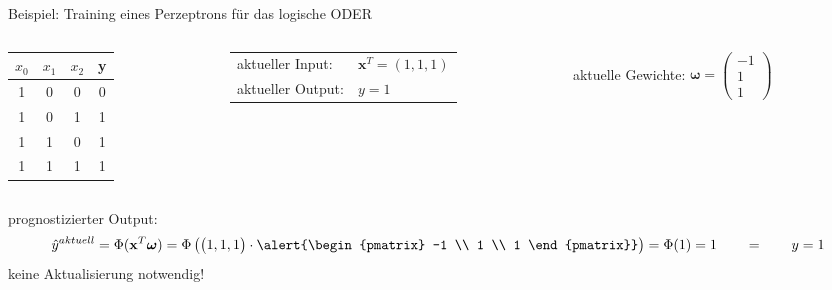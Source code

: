 \documentclass[11pt, aspectratio=169, t]{beamer}
\begin{document}
\begin{frame}{Beispiel: Training eines Perzeptrons für das logische ODER}
\begin{small}
\begin{columns}
\begin{column}{0.25\textwidth}
\hspace{0.5cm}
\begin{footnotesize}
\begin{tabular}{cccc} \toprule
$x_0$ & $x_1$ & $x_2$ & y \\ \midrule
1 & 0 & 0 & 0 \\
1 & 0 & 1 & 1 \\
1 & 1 & 0 & 1 \\
1 & 1 & 1 & 1 \\ \bottomrule
\end{tabular} \end{footnotesize}
\end{column}
\begin{column}{0.4\textwidth}
\begin{tabular}{ll}
aktueller Input: & $\mathbf{x}^{T} = (1, 1, 1)$ \\
aktueller Output: & $y=1$ \\
\end{tabular}
\end{column}
\begin{column}{0.4\textwidth}
aktuelle Gewichte: \alert{ $\boldsymbol{\omega} = \begin{pmatrix} -1 \\ 1 \\ 1 \end{pmatrix}$ }
\end{column}
\end{columns}
prognostizierter Output:
\[\hat{y}^{aktuell} = \Phi(\mathbf{x}^{T}\boldsymbol{\omega}) = \Phi\left( \begin{pmatrix} 1, 1, 1 \end{pmatrix}\cdot \alert{\begin{pmatrix} -1 \\ 1 \\ 1 \end{pmatrix}} \right) = \Phi(1) = 1 \qquad = \qquad y = 1\]
keine Aktualisierung notwendig!
\begin{align*} %
\phantom{\omega_0^{\text{neu}}} & \\
\phantom{\omega_1^{\text{neu}}} & \\
\phantom{\omega_2^{\text{neu}}} &
\end{align*}
\end{small}
\end{frame}
\end{document}

